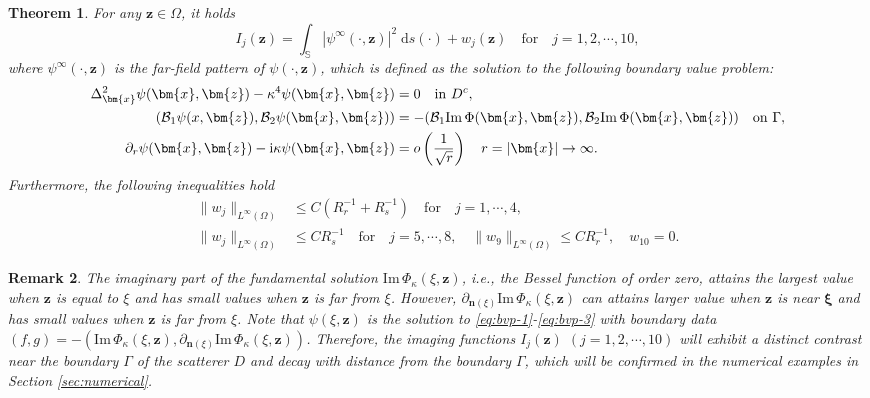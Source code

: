 \documentclass[10pt,a4paper]{article}
\numberwithin{equation}{section}
\newtheorem{theorem}{Theorem}[section]
\newtheorem{remark}[theorem]{Remark}
\begin{document}
\begin{theorem}
  For any $\bm{ z }\in \Omega$, it holds
     \begin{equation*}
       I_{j}(\bm{ z }) =
       \int_{ \mathbb{S}  } | \psi^{\infty}(\cdot, \bm{ z } ) | ^2 \;\mathrm{d}s(\cdot)
       +  w_j(\bm{ z }) \quad  \text{for} \quad j=1,2,\cdots,10,
     \end{equation*}
     where $\psi^{\infty}(\cdot, \bm{ z } )$ is the far-field pattern of $\psi(\cdot, \bm{ z } )$, which is defined as the solution to the  following boundary value problem:
     \begin{subequations}\notag
    \begin{align}
\Delta^{2}_{\bm{ x }}\psi(\bm{ x }, \bm{ z }) - \kappa^4 \psi(\bm{ x }, \bm{ z })  & =   0  \quad \mathrm{ in } ~ D^c, \\
( \mathcal{B}_1  \psi({ x }, \bm{ z }), \mathcal{B}_{2} \psi(\bm{ x }, \bm{ z }))    &  =  - (\mathcal{B}_1 \mathrm{Im}\, \Phi(\bm{ x }, \bm{ z }), \mathcal{B}_2  \mathrm{Im}\, \Phi(\bm{ x }, \bm{ z }))  \quad \mathrm{ on } ~ \Gamma,  \\
      \partial_{r}\psi(\bm{ x }, \bm{ z }) - \mathrm{ i } \kappa \psi(\bm{ x }, \bm{ z })  &  =  o \left( \dfrac{1}{\sqrt{r}} \right) \quad r =| \bm{ x } | \to \infty.
\end{align}
\end{subequations}
     Furthermore, the following inequalities hold
     \begin{align*}
           \| w_j \|_{L^{\infty}(\Omega)} &\leq C(R_r^{-1}+ R_s^{-1}) \quad \text{for}\quad  j=1,\cdots,4,\\
     \| w_j \|_{L^{\infty}(\Omega)} &\leq C R_s^{-1} \quad \text{for}\quad  j=5,\cdots,8, \quad 
     \| w_9 \|_{L^{\infty}(\Omega)} \leq C R_r^{-1} ,\quad w_{10} = 0.
     \end{align*}

   \end{theorem}
   \begin{remark}
     The imaginary part of the fundamental solution $\mathrm{Im}\,\Phi_{\kappa}(\xi ,\bm{ z })$, i.e., the Bessel function of order zero, attains the largest value  when $\bm{ z }$ is equal to  $\xi$ and  has small values  when $\bm{ z }$ is far from $\xi$. However, $\partial_{\bm{n} (\xi)} \mathrm{Im}\,\Phi_{\kappa}(\xi ,\bm{ z })$ can attains larger value when $\bm{ z }$ is near $\bm{ \xi  }$ and has small values when $\bm{ z }$ is far from $\xi$. Note that $\psi(\xi ,\bm{ z })$ is the solution to \eqref{eq:bvp-1}-\eqref{eq:bvp-3}  with boundary data $(f,g)=-(\mathrm{Im}\,\Phi_{\kappa}(\xi ,\bm{ z }),\partial_{\bm{n} (\xi)} \mathrm{Im}\,\Phi_{\kappa}(\xi ,\bm{ z }))$. Therefore, the imaging functions $I_j(\bm{ z })$ $(j=1,2,\cdots,10)$ will exhibit a distinct contrast near the boundary $\Gamma$ of the scatterer $D$ and decay  with distance from the boundary $\Gamma$, which will be confirmed in the numerical examples in Section \ref{sec:numerical}.
   \end{remark}
\end{document}
